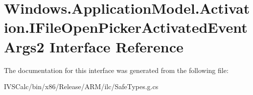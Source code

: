 \hypertarget{interface_windows_1_1_application_model_1_1_activation_1_1_i_file_open_picker_activated_event_args2}{}\section{Windows.\+Application\+Model.\+Activation.\+I\+File\+Open\+Picker\+Activated\+Event\+Args2 Interface Reference}
\label{interface_windows_1_1_application_model_1_1_activation_1_1_i_file_open_picker_activated_event_args2}


The documentation for this interface was generated from the following file\+:\begin{DoxyCompactItemize}
\item 
I\+V\+S\+Calc/bin/x86/\+Release/\+A\+R\+M/ilc/Safe\+Types.\+g.\+cs\end{DoxyCompactItemize}

